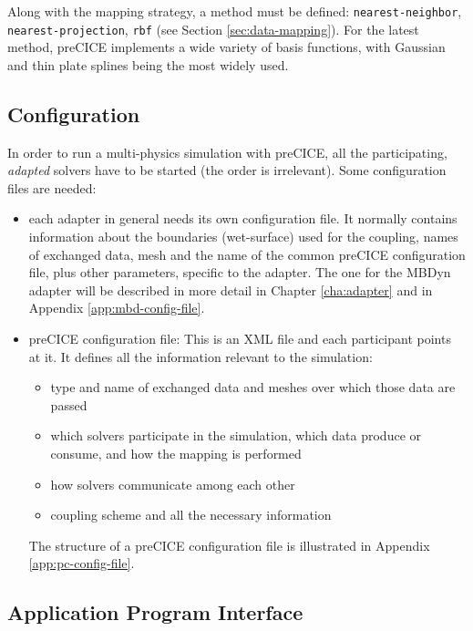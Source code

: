 Along with the mapping strategy, a method must be defined: \texttt{nearest-neighbor}, \texttt{nearest-projection}, \texttt{rbf} (see Section \ref{sec:data-mapping}). For the latest method, preCICE implements a wide variety of basis functions, with Gaussian and thin plate splines being the most widely used.

 

\subsection{Configuration}
\label{sec:pc-config}

In order to run a multi-physics simulation with preCICE, all the participating, \textit{adapted} solvers have to be started (the order is irrelevant).
Some configuration files are needed:

\begin{itemize}
	\item each adapter in general needs its own configuration file. It normally contains information about the boundaries (wet-surface) used for the coupling, names of exchanged data, mesh and the name of the common preCICE configuration file, plus other parameters, specific to the adapter. The one for the MBDyn adapter will be described in more detail in Chapter \ref{cha:adapter} and in Appendix \ref{app:mbd-config-file}.
	\item preCICE configuration file: This is an XML file and each participant points at it. It defines all the information relevant to the simulation:
	\begin{itemize}
		\item type and name of exchanged data and meshes over which those data are passed
		\item which solvers participate in the simulation, which data produce or consume, and how the mapping is performed
		\item how solvers communicate among each other
		\item coupling scheme and all the necessary information 
	\end{itemize}
	
	The structure of a preCICE configuration file is illustrated in Appendix \ref{app:pc-config-file}.
		
\end{itemize}


\subsection{Application Program Interface}
\label{sec:pc-api}

